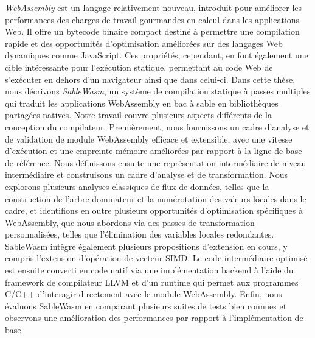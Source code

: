 \begin{spacing}{1.4}
    \textit{WebAssembly} est un langage relativement nouveau, introduit pour améliorer les performances des charges de travail gourmandes en calcul dans les applications Web. Il offre un bytecode binaire compact destiné à permettre une compilation rapide et des opportunités d'optimisation améliorées sur des langages Web dynamiques comme JavaScript. Ces propriétés, cependant, en font également une cible intéressante pour l'exécution statique, permettant au code Web de s'exécuter en dehors d'un navigateur ainsi que dans celui-ci. Dans cette thèse, nous décrivons \textit{SableWasm}, un système de compilation statique à passes multiples qui traduit les applications WebAssembly en bac à sable en bibliothèques partagées natives. Notre travail couvre plusieurs aspects différents de la conception du compilateur. Premièrement, nous fournissons un cadre d'analyse et de validation de module WebAssembly efficace et extensible, avec une vitesse d'exécution et une empreinte mémoire améliorées par rapport à la ligne de base de référence. Nous définissons ensuite une représentation intermédiaire de niveau intermédiaire et construisons un cadre d'analyse et de transformation. Nous explorons plusieurs analyses classiques de flux de données, telles que la construction de l'arbre dominateur et la numérotation des valeurs locales dans le cadre, et identifions en outre plusieurs opportunités d'optimisation spécifiques à WebAssembly, que nous abordons via des passes de transformation personnalisées, telles que l'élimination des variables locales redondantes. SableWasm intègre également plusieurs propositions d'extension en cours, y compris l'extension d'opération de vecteur SIMD. Le code intermédiaire optimisé est ensuite converti en code natif via une implémentation backend à l'aide du framework de compilateur LLVM et d'un runtime qui permet aux programmes C/C++ d'interagir directement avec le module WebAssembly. Enfin, nous évaluons SableWasm en comparant plusieurs suites de tests bien connues et observons une amélioration des performances par rapport à l'implémentation de base.
\end{spacing}